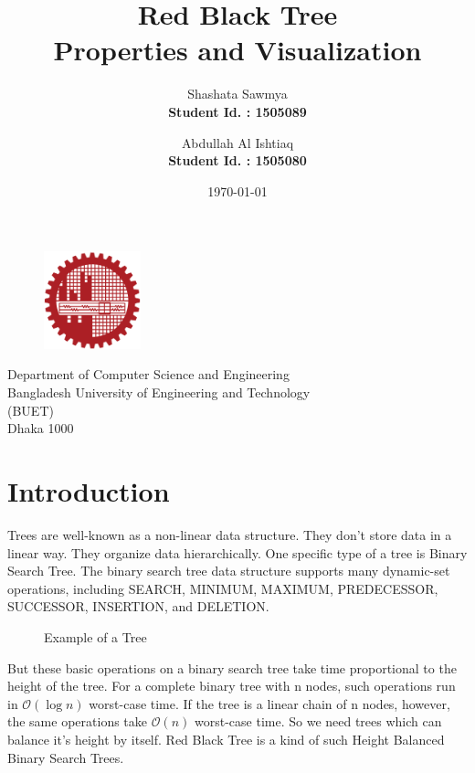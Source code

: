 \documentclass{article}[10pt]
\title{\Huge{Red Black Tree} \\\Large{Properties and Visualization} }
\author{Shashata Sawmya \\
        \textbf{Student Id. : 1505089} 
        \and 
        Abdullah Al Ishtiaq \\
        \textbf{Student Id. : 1505080}}
\date{\today}
\begin{document}
\maketitle

\vspace{4cm}

\begin{figure}[h!]
\centering
    \includegraphics[width = 0.25\textwidth]{Pictures/logoBUET.png}
\end{figure}
\begin{center}

\vspace{.5cm}

\Large{Department of Computer Science and Engineering \\
    Bangladesh University of Engineering and Technology \\
    (BUET) \\
    Dhaka 1000 }

\end{center}

\newpage

\tableofcontents
\newpage


\section{Introduction}
Trees are well-known as a non-linear data structure. They don’t store data in a linear way. They organize data hierarchically. One specific type of a tree is Binary Search Tree. The binary search tree data structure supports many dynamic-set operations, including
SEARCH, MINIMUM, MAXIMUM, PREDECESSOR, SUCCESSOR, INSERTION, and DELETION.\\

\label{sec:intro}

\begin{figure}[h]
    \centering
    
    \caption{Example of a Tree}
    \label{fig:Tree}
\end{figure}


But these basic operations on a binary search tree take time proportional to the height of the tree. For a complete binary tree with n nodes, such operations run in $\mathcal{O}(\log n)$ worst-case time. If the tree is a linear chain of n nodes, however, the same operations take $\mathcal{O}(n)$ worst-case time. So we need trees which can balance it's height by itself. Red Black Tree is a kind of such Height Balanced Binary Search Trees.
\end{document}
